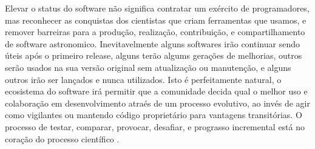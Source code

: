 


Elevar o status do software não significa contratar um exército de programadores,
mas reconhecer as conquistas dos cientistas que criam ferramentas que usamos,
e remover barreiras para a produção, realização, contribuição, e compartilhamento de software astronomico.
Inevitavelmente alguns softwares irão continuar sendo úteis após o primeiro release,
alguns terão algums gerações de melhorias, outros serão usados na sua versão original sem atualização ou manutenção,
e alguns outros irão ser lançados e nunca utilizados. Isto é perfeitamente natural,
o ecosistema do software irá permitir que a comunidade decida qual o melhor uso e
colaboração em desenvolvimento atraés de um processo evolutivo, ao invés de agir como vigilantes
ou mantendo código proprietário para vantagens transitórias. O processo de testar, comparar,
provocar, desafiar, e prograsso incremental está no coração do processo científico 
\cite{weiner2009astronomical}.

